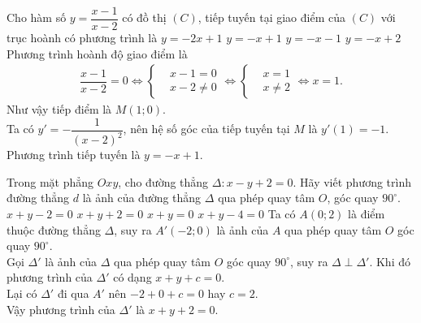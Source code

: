 \begin{ex}%
 Cho hàm số $y=\dfrac{x-1}{x-2}$ có đồ thị $(C)$, tiếp tuyến tại giao điểm của $(C)$ với trục hoành có phương trình là
 \choice
  {$y=-2x+1$}
  {\True $y=-x+1$}
  {$y=-x-1$}
  {$y=-x+2$}
 \loigiai
  {
  Phương trình hoành độ giao điểm là
  \begin{eqnarray*}
   \dfrac{x-1}{x-2}=0 \Leftrightarrow\left\{\begin{aligned}&x-1=0 \\&x-2\neq 0\end{aligned}\right. \Leftrightarrow\left\{\begin{aligned}&x=1 \\&x\neq 2\end{aligned}\right. \Leftrightarrow x=1.
  \end{eqnarray*}
  Như vậy tiếp điểm là $M(1;0)$.\\
  Ta có $y'=-\dfrac{1}{(x-2)^2}$, nên hệ số góc của tiếp tuyến tại $M$ là $y'(1)=-1$.\\
  Phương trình tiếp tuyến là $y=-x+1$.
  }
\end{ex}

\begin{ex}%
 Trong mặt phẳng $Oxy$, cho đường thẳng $\Delta\colon x-y+2=0$. Hãy viết phương trình đường thẳng $d$ là ảnh của đường thẳng $\Delta$ qua phép quay tâm $O$, góc quay $90^\circ$.
 \choice
  {$x+y-2=0$}
  {\True $x+y+2=0$}
  {$x+y=0$}
  {$x+y-4=0$}
 \loigiai
  {
  Ta có $A(0;2)$ là điểm thuộc đường thẳng $\Delta$, suy ra $A'(-2;0)$ là ảnh của $A$ qua phép quay tâm $O$ góc quay $90^\circ$.\\
  Gọi $\Delta'$ là ảnh của $\Delta$ qua phép quay tâm $O$ góc quay $90^\circ$, suy ra $\Delta \perp \Delta'$. Khi đó phương trình của $\Delta'$ có dạng $x+y+c=0$.\\
  Lại có $\Delta'$ đi qua $A'$ nên $-2+0+c=0$ hay $c=2$.\\
  Vậy phương trình của $\Delta'$ là $x+y+2=0$.
  }
\end{ex}

